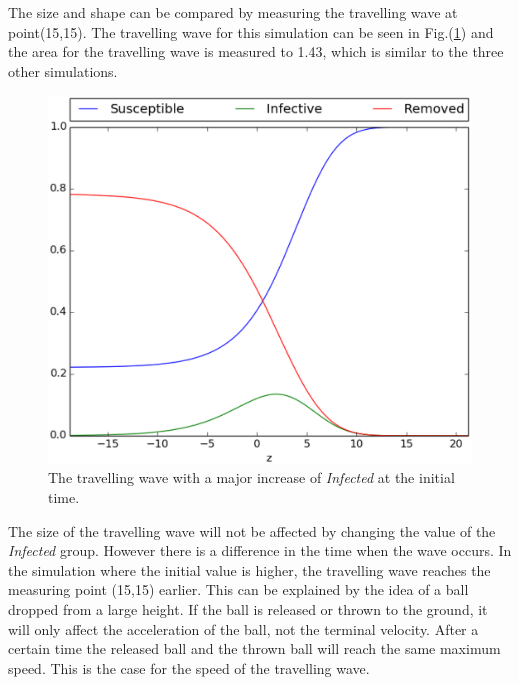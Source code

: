 \documentclass[%
twoside,                 %
final,                   %
10pt]{article}
\begin{document}
\vspace{3mm}




\vspace{3mm}


The size and shape can be compared by measuring the travelling wave at point(15,15). The travelling wave for this simulation can be seen in Fig.(\ref{fig:initial_trav_wave}) and the area for the travelling wave is measured to 1.43, which is similar to the three other simulations.


\begin{figure}[ht]
  \centerline{\includegraphics[width=0.8\linewidth]{plots/TW_2D_initial_z_lambda_0_5.eps}}
  \caption{
  \label{fig:initial_trav_wave} The travelling wave with a major increase of \emph{Infected} at the initial time.
  }
\end{figure}




\vspace{3mm}




\vspace{3mm}


The size of the travelling  wave will not be affected by changing the value of the \emph{Infected} group. However there is a difference in the time when the wave occurs. In the simulation where the initial value is higher, the travelling wave reaches the measuring point (15,15) earlier. This can be explained by the idea of a ball dropped from a large height. If the ball is released or thrown to the ground, it will only affect the acceleration of the ball, not the terminal velocity. After a certain time the released ball and the thrown ball will reach the same maximum speed. This is the case for the speed of the travelling wave. 
\end{document}
